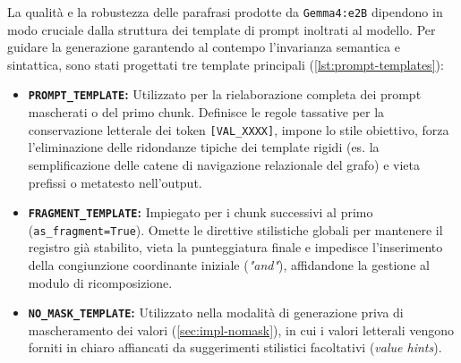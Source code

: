 \documentclass[12pt,a4paper,openright,twoside]{book}
\begin{document}
La qualità e la robustezza delle parafrasi prodotte da \texttt{Gemma4:e2B}
dipendono in modo cruciale dalla struttura dei template di prompt inoltrati al
modello. Per guidare la generazione garantendo al contempo l'invarianza
semantica e sintattica, sono stati progettati tre template principali
(\cref{lst:prompt-templates}):

\begin{itemize}
    \item \textbf{\texttt{PROMPT\_TEMPLATE}:} Utilizzato per la rielaborazione
          completa dei prompt mascherati o del primo chunk. Definisce le regole
          tassative per la conservazione letterale dei token
          \texttt{[VAL\_XXXX]}, impone lo stile obiettivo, forza l'eliminazione
          delle ridondanze tipiche dei template rigidi (es. la semplificazione
          delle catene di navigazione relazionale del grafo) e vieta prefissi o
          metatesto nell'output.
    \item \textbf{\texttt{FRAG\-MENT\_\-\texttt{TEM\-PLATE}}:} Impiegato per i
          chunk successivi al primo (\texttt{as\_fra\-gment=True}). Omette le
          direttive stilistiche globali per mantenere il registro già stabilito,
          vieta la punteggiatura finale e impedisce l'inserimento della
          congiunzione coordinante iniziale (\emph{"and"}), affidandone la
          gestione al modulo di ricomposizione.
    \item \textbf{\texttt{NO\_MASK\_TEMPLATE}:} Utilizzato nella modalità di
          generazione priva di mascheramento dei valori
          (\cref{sec:impl-nomask}), in cui i valori letterali vengono forniti in
          chiaro affiancati da suggerimenti stilistici facoltativi
          (\textit{value hints}).
\end{itemize}
\end{document}
